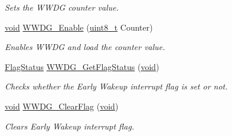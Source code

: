 \begin{DoxyCompactItemize}
\begin{DoxyCompactList}\small\item\em Sets the W\+W\+DG counter value. \end{DoxyCompactList}\item 
\hyperlink{usb__devapi_8h_afabf60e7f57651d6d595a02c75f07cd0}{void} \hyperlink{group___w_w_d_g___exported___functions_ga10dc2554d0b504b5472e3ecf0f02a9e6}{W\+W\+D\+G\+\_\+\+Enable} (\hyperlink{_p_e___types_8h_aba7bc1797add20fe3efdf37ced1182c5}{uint8\+\_\+t} Counter)
\begin{DoxyCompactList}\small\item\em Enables W\+W\+DG and load the counter value. \end{DoxyCompactList}\item 
\hyperlink{agilefox_2library_2inc_2stm32f10x__type_8h_a89136caac2e14c55151f527ac02daaff}{Flag\+Status} \hyperlink{group___w_w_d_g___exported___functions_ga7df4882d45918b9b8249dfca1e44fabc}{W\+W\+D\+G\+\_\+\+Get\+Flag\+Status} (\hyperlink{usb__devapi_8h_afabf60e7f57651d6d595a02c75f07cd0}{void})
\begin{DoxyCompactList}\small\item\em Checks whether the Early Wakeup interrupt flag is set or not. \end{DoxyCompactList}\item 
\hyperlink{usb__devapi_8h_afabf60e7f57651d6d595a02c75f07cd0}{void} \hyperlink{group___w_w_d_g___exported___functions_gabd2b5a6317c2e1a3ab0795838ce59dd2}{W\+W\+D\+G\+\_\+\+Clear\+Flag} (\hyperlink{usb__devapi_8h_afabf60e7f57651d6d595a02c75f07cd0}{void})
\begin{DoxyCompactList}\small\item\em Clears Early Wakeup interrupt flag. \end{DoxyCompactList}\end{DoxyCompactItemize}
